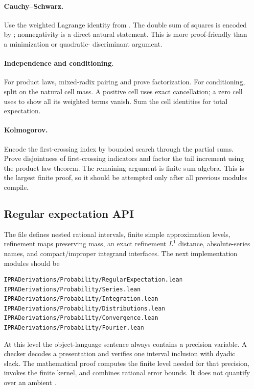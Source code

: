 \paragraph{Cauchy--Schwarz.}
Use the weighted Lagrange identity from .  The double sum of
squares is encoded by ; nonnegativity is a direct natural
statement.  This is more proof-friendly than a minimization or quadratic-
discriminant argument.

\paragraph{Independence and conditioning.}
For product laws, mixed-radix pairing and  prove factorization.
For conditioning, split on the natural cell mass.  A positive cell uses exact
cancellation; a zero cell uses  to show all its weighted
terms vanish.  Sum the cell identities for total expectation.

\paragraph{Kolmogorov.}
Encode the first-crossing index by bounded search through the partial sums.
Prove disjointness of first-crossing indicators and factor the tail increment
using the product-law theorem.  The remaining argument is finite sum algebra.
This is the largest finite proof, so it should be attempted only after all
previous modules compile.

\subsection{Regular expectation API}

The file  defines nested rational intervals,
finite simple approximation levels, refinement maps preserving mass, an exact
refinement \(L^1\) distance, absolute-series names, and compact/improper
integrand interfaces.  The next implementation modules should be

\begin{verbatim}
IPRADerivations/Probability/RegularExpectation.lean
IPRADerivations/Probability/Series.lean
IPRADerivations/Probability/Integration.lean
IPRADerivations/Probability/Distributions.lean
IPRADerivations/Probability/Convergence.lean
IPRADerivations/Probability/Fourier.lean
\end{verbatim}

At this level the object-language sentence always contains a precision
variable.  A checker decodes a presentation and verifies one interval
inclusion with dyadic slack.  The mathematical proof computes the finite level
needed for that precision, invokes the finite kernel, and combines rational
error bounds.  It does not quantify over an ambient .

